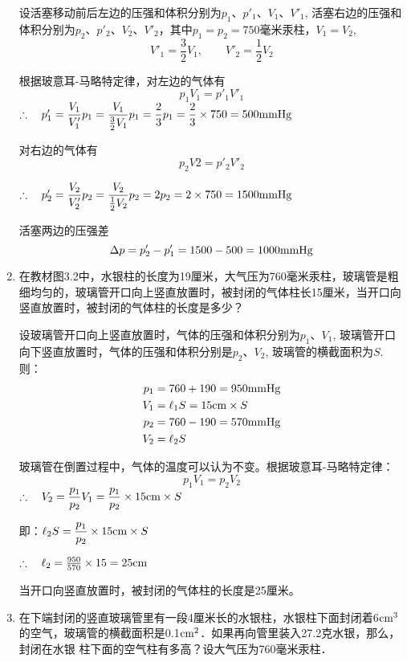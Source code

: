 \begin{enumerate}
\begin{solution}
设活塞移动前后左边的压强和体积分别为$p_1$、$p'_1$、$V_1$、$V'_1$, 活塞右边的压强和体积分别为$p_2$、$p'_2$、$V_2$、$V'_2$，其中$p_1=p_2=750$毫米汞柱，$V_1=V_2$,
\[V'_1=\frac{3}{2}V_1,\qquad V'_2=\frac{1}{2}V_2\]

根据玻意耳-马略特定律，对左边的气体有
    \[p_1V_1=p'_1V'_1\]
$\therefore\quad p'_1=\dfrac{V_1}{V'_1}p_1=\dfrac{V_1}{\frac{3}{2}V_1}p_1=\dfrac{2}{3}p_1=\dfrac{2}{3}\times 750=500{\rm mmHg}$
    
    对右边的气体有
    \[p_2V2=p'_2V'_2\]
    
$\therefore\quad p'_2=\dfrac{V_2}{V'_2}p_2=\dfrac{V_2}{\frac{1}{2}V_2}p_2=2p_2=2\times 750=1500{\rm mmHg}$
    
    活塞两边的压强差
\[\Delta p=p'_2-p'_1=1500-500=1000{\rm mmHg}\]
    
\end{solution}

	\item 在教材图3.2中，水银柱的长度为19厘米，大气压为760毫米汞柱，玻璃管是粗细均匀的，玻璃管开口向上竖直放置时，被封闭的气体柱长15厘米，当开口向竖直放置时，被封闭的气体柱的长度是多少？
	
\begin{solution}  
设玻璃管开口向上竖直放置时，气体的压强和体积分别为$p_1$、$V_1$, 玻璃管开口向下竖直放置时，气体的压强和体积分别是$p_2$、$V_2$, 玻璃管的横截面积为$S$.
    则：
\[\begin{split}
      p_1&=760+190=950{\rm mmHg}\\
    V_1&=\ell_1S=15{\rm cm}\times S\\
    p_2&=760-190=570{\rm mmHg}\\
    V_2&=\ell_2S  
\end{split}\]    
    
玻璃管在倒置过程中，气体的温度可以认为不变。根据玻意耳-马略特定律：
\[p_1V_1=p_2V_2\]
$\therefore\quad V_2=\dfrac{p_1}{p_2}V_1=\dfrac{p_1}{p_2}\times 15{\rm cm}\times S$

即：$\ell_2S=\dfrac{p_1}{p_2}\times 15{\rm cm}\times S$

$\therefore\quad \ell_2=\frac{950}{570}\times 15=25{\rm cm}$

当开口向竖直放置时，被封闭的气体柱的长度是25厘米。
\end{solution}  
	\item 在下端封闭的竖直玻璃管里有一段4厘米长的水银柱，水银柱下面封闭着6${\rm cm^3}$的空气，玻璃管的横截面积是0.1${\rm cm^2}$．如果再向管里装入27.2克水银，那么，封闭在水银
 柱下面的空气柱有多高？设大气压为760毫米汞柱．


\end{enumerate}
